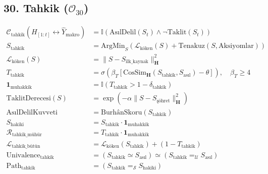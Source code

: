 \documentclass[11pt, a4paper]{article}
\begin{document}
\subsection{30. Tahkik ($\mathcal{O}_{30}$)}
\begin{align}
\mathcal{C}_{\text{tahkik}}(H_{[1:t]} \leftrightarrow \hat{Y}_{\text{makro}}) &= \mathbb{I}\left( \text{AsılDelil}(S_t) \land \neg \text{Taklit}(S_t) \right) \\
S_{\text{tahkik}} &= \text{ArgMin}_{S} \left( \mathcal{L}_{\text{köken}}(S) + \text{Tenakuz}(S, \text{Aksiyomlar}) \right) \\
\mathcal{L}_{\text{köken}}(S) &= \| S - S_{\text{ilk\_kaynak}} \|_{\mathbf{H}}^2 \\
T_{\text{tahkik}} &= \sigma\left( \beta_T \left[ \text{CosSim}_{\mathbf{H}}(S_{\text{tahkik}}, S_{\text{asıl}}) - \theta \right] \right), \quad \beta_T \ge 4 \\
\mathbf{1}_{\text{muhakkik}} &= \mathbb{I}(T_{\text{tahkik}} > 1 - \delta_{\text{tahkik}}) \\
\text{TaklitDerecesi}(S) &= \exp(-\alpha \|S - S_{\text{şöhret}}\|_{\mathbf{H}}^2) \\
\text{AsılDelilKuvveti} &= \text{BurhânSkoru}(S_{\text{tahkik}}) \\
S_{\text{hakiki}} &= S_{\text{tahkik}} \cdot \mathbf{1}_{\text{muhakkik}} \\
\mathcal{R}_{\text{tahkik\_mühür}} &= T_{\text{tahkik}} \cdot \mathbf{1}_{\text{muhakkik}} \\
\mathcal{L}_{\text{tahkik\_bütün}} &= \mathcal{L}_{\text{köken}}(S_{\text{tahkik}}) + (1 - T_{\text{tahkik}}) \\
\text{Univalence}_{\text{tahkik}} &= (S_{\text{tahkik}} \simeq S_{\text{asıl}}) \simeq (S_{\text{tahkik}} =_{\mathcal{U}} S_{\text{asıl}}) \\
\text{Path}_{\text{tahkik}} &= (S_{\text{tahkik}} =_{\mathcal{S}} S_{\text{hakiki}})
\end{align}
\end{document}
